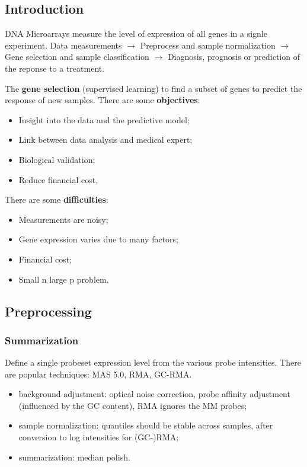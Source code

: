 
\subsection{Introduction}

DNA Microarrays measure the level of expression of all genes in a signle experiment. Data measurements $\rightarrow$ Preprocess and sample normalization $\rightarrow$ Gene selection and sample classification $\rightarrow$ Diagnosis, prognosis or prediction of the reponse to a treatment.

The \textbf{gene selection} (supervised learning) to find a subset of genes to predict the response of new samples. There are some \textbf{objectives}:
\begin{itemize}
	\item Insight into the data and the predictive model;
	\item Link between data analysis and medical expert;
	\item Biological validation;
	\item Reduce financial cost.
\end{itemize}

There are some \textbf{difficulties}:
\begin{itemize}
	\item Measurements are noisy;
	\item Gene expression varies due to many factors;
	\item Financial cost;
	\item Small n large p problem.
\end{itemize}

\subsection{Preprocessing}

\subsubsection{Summarization}

Define a single probeset expression level from the various probe intensities. There are popular techniques: MAS 5.0, RMA, GC-RMA. 
\begin{itemize}
	\item background adjustment: optical noise correction, probe affinity adjustment (influenced by the GC content), RMA ignores the MM probes;
	\item sample normalization: quantiles should be stable across samples, after conversion to log intensities for (GC-)RMA;
	\item summarization: median polish.
\end{itemize}

